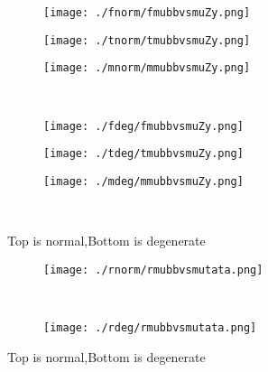 \documentclass[aps,floats,floatfix,nofootinbib]{revtex4-1}
\begin{document}
\begin{center}
\begin{figure}
\begin{subfigure}{0.3\textwidth}
\texttt{[image: ./fnorm/fmubbvsmuZy.png]}
\label{}
\end{subfigure}
\begin{subfigure}{0.3\textwidth}
\texttt{[image: ./tnorm/tmubbvsmuZy.png]}
\label{}
\end{subfigure}
\begin{subfigure}{0.3\textwidth}
\texttt{[image: ./mnorm/mmubbvsmuZy.png]}
\label{}
\end{subfigure}\\
\begin{subfigure}{0.3\textwidth}
\texttt{[image: ./fdeg/fmubbvsmuZy.png]}
\label{}
\end{subfigure}
\begin{subfigure}{0.3\textwidth}
\texttt{[image: ./tdeg/tmubbvsmuZy.png]}
\label{}
\end{subfigure}
\begin{subfigure}{0.3\textwidth}
\texttt{[image: ./mdeg/mmubbvsmuZy.png]}
\label{}
\end{subfigure}\\
\caption{Top is normal,Bottom is degenerate}
\end{figure}
\end{center}

\begin{center}
\begin{figure}
\begin{subfigure}{1.0\textwidth}
\texttt{[image: ./rnorm/rmubbvsmutata.png]}
\label{}
\end{subfigure}\\
\begin{subfigure}{1.0\textwidth}
\texttt{[image: ./rdeg/rmubbvsmutata.png]}
\label{}
\end{subfigure}
\caption{Top is normal,Bottom is degenerate}
\end{figure}
\end{center}
\end{document}
